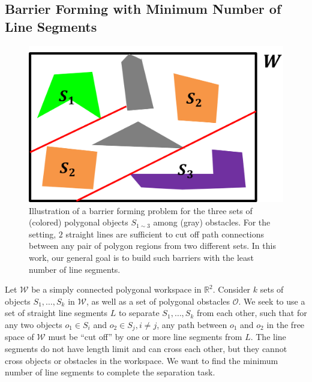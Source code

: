 \subsection{Barrier Forming with Minimum Number of Line Segments}

\begin{figure}[ht]
    \centering
    \vspace{.05in}
    \includegraphics[width = .35\textwidth]{chapters/bf/fig/formulation_pic.png}
    \vspace{.05in}
    \caption[Illustration of a barrier forming problem for the three sets of polygonal objects]
    {Illustration of a barrier forming problem for the three sets of (colored) polygonal objects $S_{1\sim3}$ among (gray) obstacles. 
    For the setting, $2$ straight lines are sufficient to cut off path connections between any pair of polygon regions from two different sets. 
    In this work, our general goal is to build such barriers with the least number of line segments.}
    \label{fig:bf-illustration}
\end{figure}

Let $\mathcal{W}$ be a simply connected polygonal workspace in $\mathbb R^2$. Consider $k$ sets of objects $S_1, \dots, S_k$ in $\mathcal W$, as well as a set of polygonal obstacles $\mathcal O$. 
We seek to use a set of straight line segments $L$ to separate $S_1, \dots, S_k$ from each other, such that for any two objects $o_1 \in S_i$ and $o_2 \in S_j, i \ne j$, any path between $o_1$ and $o_2$ in the free space of $\mathcal W$ must be ``cut off'' by one or more line segments from $L$. 
The line segments do not have length limit and can cross each other, but they cannot cross objects or obstacles in the workspace. We want to find the minimum number of line segments to complete the separation task. 

